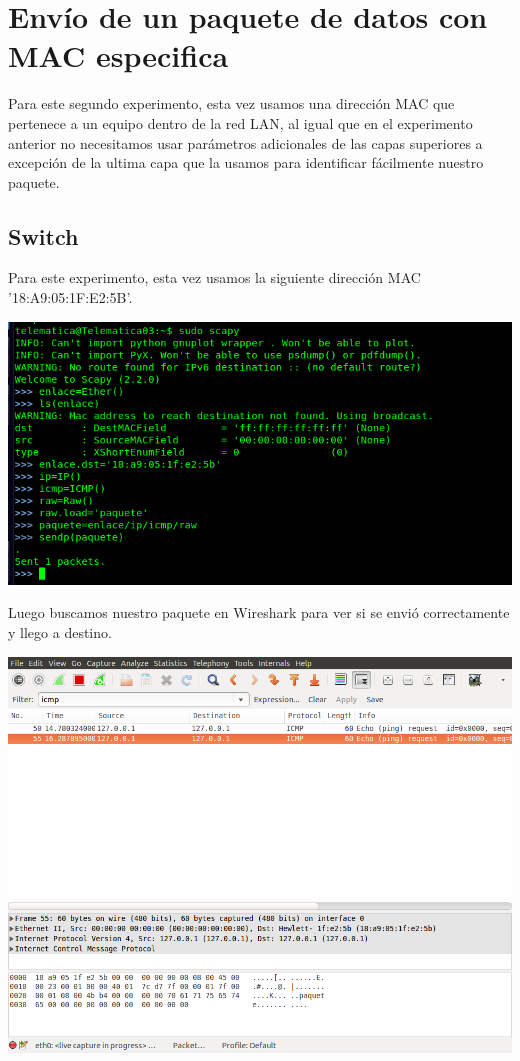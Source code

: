 \documentclass[spanish]{udpreport}
\begin{document}
\section{Envío de un paquete de datos con MAC especifica}

Para este segundo experimento, esta vez usamos una dirección MAC que pertenece a un equipo dentro de la red LAN, al igual que en el experimento anterior no necesitamos usar parámetros adicionales de las capas superiores a excepción de la ultima capa que la usamos para identificar fácilmente nuestro paquete.

\subsection{Switch}

Para este experimento, esta vez usamos la siguiente dirección MAC '18:A9:05:1F:E2:5B'.
\begin{center}
	\includegraphics[scale=.37]{imagenes/Switch/Test_2.png}
\end{center}

Luego buscamos nuestro paquete en Wireshark para ver si se envió correctamente y llego a destino.

\begin{center}
	\includegraphics[scale=.37]{imagenes/Switch/Test_2_Wireshark.png}
\end{center}
\end{document}

